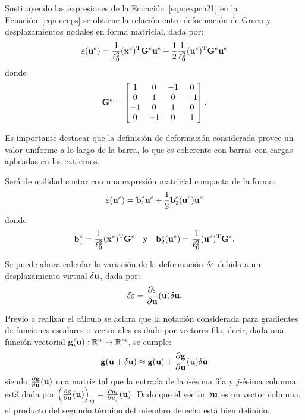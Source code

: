 Sustituyendo las expresiones de la Ecuación~\eqref{eqn:expru21} en la Ecuación~\eqref{eqn:eceps} se obtiene la relación entre deformación de Green y desplazamientos nodales en forma matricial, dada por:
%
\begin{equation}
\varepsilon ({\bf u}^e) = \frac{1}{\ell_0^2} 
({\bf x}^e)^{\text{T}} {\bf G}^e {\bf u}^e +  \frac{1}{2} \frac{1}{\ell_0^2}  ({\bf u}^e)^{\text{T}} {\bf G}^e {\bf u}^e
\end{equation}
%
donde
%
\begin{equation}
{\bf G}^e =
\left[\begin{matrix}
1 & 0 & -1 & 0\\
0 & 1 &0 & -1\\
-1 & 0& 1 & 0\\
0 & -1 &0 & 1\\
\end{matrix}
\right].
\end{equation}


Es importante destacar que la definición de deformación considerada provee un valor uniforme a lo largo de la barra, lo que es coherente con barras con cargas aplicadas en los extremos. %
%


Será de utilidad contar con una expresión matricial compacta de la forma:
%
\begin{equation}
\varepsilon ({\bf u}^e) = {\bf b}^e_1 {\bf u}^e +  \frac{1}{2} {\bf b}_{2}^e({\bf u}^e) {\bf u}^e
\end{equation}
%
donde
%
\begin{equation}\label{eqn:exprbs}
{\bf b}^e_1 =  \frac{1}{\ell_0^2} 
({\bf x}^e)^{\text{T}} {\bf G}^e
\quad
\text{y}
\quad
{\bf b}^e_2 ({\bf u}^e) = \frac{1}{\ell_0^2}  ({\bf u}^e)^{\text{T}} {\bf G}^e.
\end{equation}



Se puede ahora calcular la variación de la deformación $\delta\varepsilon$ debida a un desplazamiento virtual $\delta{\bf u}$, dada por:
%
\begin{equation}
\delta \varepsilon =  \frac{\partial \varepsilon}{\partial {\bf u}}({\bf u}) \delta {\bf u}.
\end{equation}

Previo a realizar el cálculo se aclara que la notación considerada para gradientes de funciones escalares o vectoriales es dado por vectores fila, decir, dada una función vectorial ${\bf g}({\bf u}) :{\mathbb R}^n \rightarrow {\mathbb R}^m $, se cumple:
%
\begin{equation}
{\bf g}({\bf u}+\delta{\bf u}) \approx {\bf g}({\bf u}) + \frac{\partial {\bf g} }{\partial {\bf u}}({\bf u}) \delta {\bf u}
\end{equation}
%
siendo $\frac{\partial {\bf g} }{\partial {\bf u}}({\bf u})$ una matriz tal que la entrada de la $i$-ésima fila y $j$-ésima columna está dada por $ \left( \frac{\partial {\bf g} }{\partial {\bf u}}({\bf u}) \right)_{ij} =  \frac{\partial g_i }{\partial u_j }({\bf u})$. %
%
Dado que el vector $\delta {\bf u}$ es un vector columna, el producto del segundo término del miembro derecho está bien definido.


